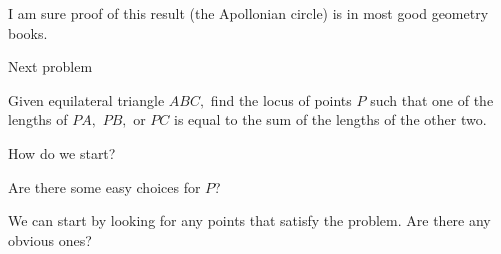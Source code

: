 I am sure proof of this result (the Apollonian circle) is in most good geometry books.

\vspace{10pt}
Next problem

\begin{example}
    Given equilateral triangle $ABC,$ find the locus of points $P$ such that one of the lengths of $PA,$ $PB,$ or $PC$ is equal to the sum of the lengths of the other two.   
\end{example}
How do we start?











Are there some easy choices for $P$?

We can start by looking for any points that satisfy the problem. Are there any obvious ones?





